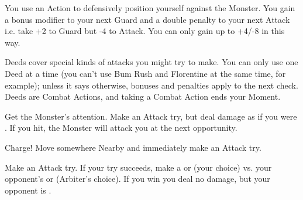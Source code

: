 \begin{multicols*}{2}
  \COMBAT [
    Name = Warding,
    Link = combat-tactical-maneuver-warding,
    Desc = Brawl weapons only
  ]


  You use an Action to defensively position yourself against the Monster.  You gain a bonus modifier to your next Guard \RO and a double penalty to your next Attack \RO i.e. take +2 to Guard but -4 to Attack. You can only gain up to +4/-8 in this way.

\begin{figure*}
\begin{center}
\end{center}
\end{figure*}


\newpage






  Deeds cover special kinds of attacks you might try to make. You can only use one Deed at a time (you can't use Bum Rush and Florentine at the same time, for example); unless it says otherwise, bonuses and penalties apply to the next \RO check. Deeds are Combat Actions, and taking a Combat Action ends your Moment.

  \COMBAT [
    Name = Bash,
    Link = combat-deeds-bash,
    Desc = Must have a shield equipped (it has to be on your arm / you have to be using it)
  ]

  Get the Monster's attention.  Make an Attack try, but deal damage as if you were . If you hit, the Monster will attack you at the next opportunity.


  \COMBAT [
    Name = Bum Rush,
    Link = combat-deeds-bum-rush,
    Desc = Must be attacking with a \VIG Brawl weapon
  ]

  Charge!  Move somewhere Nearby and immediately make an Attack try.

  \COMBAT [
    Name = Disarm,
    Link = combat-deeds-disarm,
    Desc = Brawl weapons only. Your target must be using a 1-handed weapon
  ]

  Make an Attack try.  If your try succeeds, make a \RBONE{\VIG} or \RBONE{\DEX} (your choice) vs. your opponent's \VIG or \DEX (Arbiter's choice). If you win you deal no damage, but your opponent is .



\end{multicols*}
